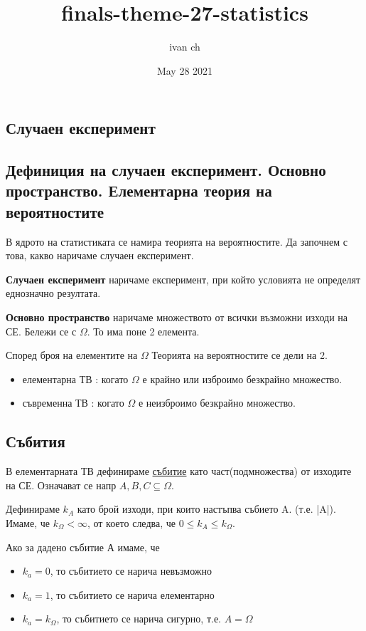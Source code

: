 \documentclass[fleqn,12pt]{article}
\title{finals-theme-27-statistics}
\author{ivan ch}
\date{May 28 2021}
\begin{document}
\maketitle

\tableofcontents

\begin{justify}

\section{Случаен експеримент}
\subsection{Дефиниция на случаен експеримент. Основно пространство. Елементарна теория на вероятностите}
В ядрото на статистиката се намира теорията на вероятностите. Да започнем с това, какво наричаме случаен експеримент. 

\textbf{Случаен експеримент} наричаме експеримент, при който условията не определят еднозначно резултата.

\textbf{Основно пространство} наричаме множеството от всички възможни изходи на СЕ. Бележи се с $\Omega$. То има поне 2
елемента. 

Според броя на елементите на $\Omega$ Теорията на вероятностите се дели на 2.
\begin{itemize}
    \item елементарна ТВ : когато $\Omega$ е крайно или изброимо безкрайно множество.
    \item съвременна ТВ : когато $\Omega$ е неизброимо безкрайно множество.
\end{itemize}

\subsection{Събития}
В елементарната ТВ дефинираме \underline{събитие} като част(подмножества) от изходите на СЕ. Означават се напр
$A, B, C \subseteq \Omega$.

Дефинираме $k_A$ като брой изходи, при които настъпва събието A. (т.е. |A|). Имаме, че $k_\Omega < \infty$, от 
което следва, че $0 \leq k_A \leq k_\Omega$.

Ако за дадено събитие А имаме, че 
\begin{itemize}
    \item $k_a = 0$, то събитието се нарича невъзможно
    \item $k_a = 1$, то събитието се нарича елементарно
    \item $k_a = k_\Omega$, то събитието се нарича сигурно, т.е. $A = \Omega$
\end{itemize}


\end{justify}
\end{document}
